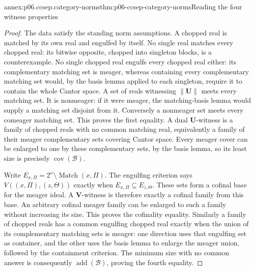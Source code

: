 \begin{annexitem}{annex:p06.ccsep.category-norms}{thm:p06-ccsep-category-norms}{Reading the four witness properties}
\begin{proof}
The data satisfy the standing norm assumptions. A chopped real is
matched by its own real and engulfed by itself. No single real matches
every chopped real: its bitwise opposite, chopped into singleton blocks,
is a counterexample. No single chopped real engulfs every chopped real
either: its complementary matching set is meager, whereas containing
every complementary matching set would, by the basis lemma applied to
each singleton, require it to contain the whole Cantor space.
A set of reals witnessing \(\|\mathbf U\|\) meets every matching set.
It is nonmeager: if it were meager, the matching-basis lemma would
supply a matching set disjoint from it. Conversely a nonmeager
set meets every comeager matching set. This proves the first equality.
A dual \(\mathbf U\)-witness is a family of chopped reals with no common
matching real, equivalently a family of their meager complementary
sets covering Cantor space. Every meager cover can be enlarged to
one by these complementary sets, by the basis lemma, so its least
size is precisely \(\operatorname{cov}(\mathcal B)\).

Write \(E_{x,\Pi}=2^\omega\setminus\operatorname{Match}(x,\Pi)\).
The engulfing criterion says
\(V((x,\Pi),(z,\Theta))\) exactly when
\(E_{x,\Pi}\subseteq E_{z,\Theta}\). These sets form a cofinal
base for the meager ideal. A \(\mathbf V\)-witness is therefore exactly
a cofinal family from this base. An arbitrary cofinal meager family
can be enlarged to such a family without increasing its size.
This proves the cofinality equality. Similarly a family of chopped
reals has a common engulfing chopped real exactly when the union
of its complementary matching sets is meager: one direction uses
that engulfing set as container, and the other uses the basis lemma
to enlarge the meager union, followed by the containment criterion.
The minimum size with no common answer is consequently
\(\operatorname{add}(\mathcal B)\), proving the fourth equality.
\end{proof}
\end{annexitem}

